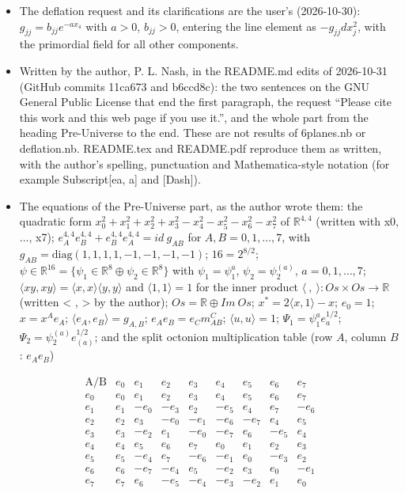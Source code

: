 \documentclass[10pt]{article}
\begin{document}
\begin{itemize}
\item The deflation request and its clarifications are the user's (2026-10-30): $g_{jj} = b_{jj}e^{-ax_4}$ with $a > 0$, $b_{jj} > 0$, entering the line element as $-g_{jj}dx_j^2$, with the primordial field for all other components.
\item Written by the author, P. L. Nash, in the README.md edits of 2026-10-31 (GitHub commits 11ca673 and b6ccd8c): the two sentences on the GNU General Public License that end the first paragraph, the request ``Please cite this work and this web page if you use it.'', and the whole part from the heading Pre-Universe to the end. These are not results of 6planes.nb or deflation.nb. README.tex and README.pdf reproduce them as written, with the author's spelling, punctuation and Mathematica-style notation (for example Subscript[ea, a] and [Dash]).
\item The equations of the Pre-Universe part, as the author wrote them: the quadratic form $x_0^2 + x_1^2 + x_2^2 + x_3^2 - x_4^2 - x_5^2 - x_6^2 - x_7^2$ of $\mathbb R^{4,4}$ (written with x0, ..., x7); $e^{4,4}_Ae^{4,4}_B + e^{4,4}_Be^{4,4}_A = id\ g_{AB}$ for $A, B = 0, 1, \dots, 7$, with $g_{AB} = \mathrm{diag}(1,1,1,1,-1,-1,-1,-1)$; $16 = 2^{8/2}$; $\psi\in\mathbb R^{16} = \{\psi_1\in\mathbb R^8\oplus\psi_2\in\mathbb R^8\}$ with $\psi_1 = \psi_1^a$, $\psi_2 = \psi_2^{(a)}$, $a = 0, 1, \dots, 7$; $\langle xy, xy\rangle = \langle x,x\rangle\langle y,y\rangle$ and $\langle 1,1\rangle = 1$ for the inner product $\langle\ ,\ \rangle: Os\times Os\to\mathbb R$ (written \textless{} , \textgreater{} by the author); $Os = \mathbb R\oplus Im\ Os$; $x^* = 2\langle x,1\rangle - x$; $e_0 = 1$; $x = x^Ae_A$; $\langle e_A, e_B\rangle = g_{A,B}$; $e_Ae_B = e_Cm^C_{AB}$; $\langle u,u\rangle = 1$; $\Psi_1 = \psi_1^ae^{1/2}_a$; $\Psi_2 = \psi_2^{(a)}e^{1/2}_{(a)}$; and the split octonion multiplication table (row $A$, column $B$: $e_Ae_B$)
\end{itemize}

\[
\begin{array}{ccccccccc}
\text{A/B} & e_0 & e_1 & e_2 & e_3 & e_4 & e_5 & e_6 & e_7 \\
e_0 & e_0 & e_1 & e_2 & e_3 & e_4 & e_5 & e_6 & e_7 \\
e_1 & e_1 & -e_0 & -e_3 & e_2 & -e_5 & e_4 & e_7 & -e_6 \\
e_2 & e_2 & e_3 & -e_0 & -e_1 & -e_6 & -e_7 & e_4 & e_5 \\
e_3 & e_3 & -e_2 & e_1 & -e_0 & -e_7 & e_6 & -e_5 & e_4 \\
e_4 & e_4 & e_5 & e_6 & e_7 & e_0 & e_1 & e_2 & e_3 \\
e_5 & e_5 & -e_4 & e_7 & -e_6 & -e_1 & e_0 & -e_3 & e_2 \\
e_6 & e_6 & -e_7 & -e_4 & e_5 & -e_2 & e_3 & e_0 & -e_1 \\
e_7 & e_7 & e_6 & -e_5 & -e_4 & -e_3 & -e_2 & e_1 & e_0
\end{array}
\]
\end{document}
